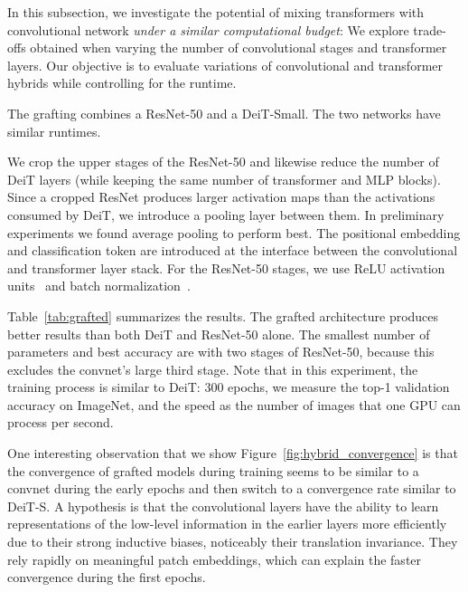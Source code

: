 \documentclass[10pt,twocolumn,letterpaper]{article}
\makeatletter
\renewcommand{\paragraph}{\@startsection{paragraph}{4}{\z@}{1.0ex \@plus 1ex \@minus .2ex}{-1em}{\normalfont\normalsize\bfseries}}
\makeatother
\begin{document}
In this subsection, we investigate the potential of mixing transformers with convolutional network \emph{under a similar computational budget}: 
We explore trade-offs obtained when varying the number of convolutional stages
and transformer layers. Our objective is to evaluate  variations of convolutional and transformer hybrids while controlling for the runtime. 






\paragraph{Grafting.}

The grafting combines a ResNet-50 and a DeiT-Small.
The two networks have similar runtimes.

We crop the upper stages of the ResNet-50 and likewise reduce the number of DeiT layers (while keeping the same number of transformer and MLP blocks). 
Since a cropped ResNet produces larger activation maps than the  activations consumed by DeiT, we introduce a pooling layer between them. 
In preliminary experiments we found average pooling to perform best.
The positional embedding and classification token are introduced at the interface between the convolutional and transformer layer stack. For the ResNet-50 stages, we use
ReLU activation units~\cite{nair2010rectified} and batch normalization~\cite{ioffe15batchnorm}.

\paragraph{Results.}
Table~\ref{tab:grafted} summarizes the results. 
The grafted architecture produces better results than both DeiT and ResNet-50 alone.
The smallest number of parameters and best accuracy are with two stages of ResNet-50, because this excludes the convnet's large third stage. 
Note that in this experiment, the training process is similar to DeiT: 300 epochs, we measure the top-1 validation accuracy on ImageNet, and the speed as the number of images that one GPU can process per second. 

One interesting observation that we show Figure~\ref{fig:hybrid_convergence} is that the convergence of grafted models during training seems to be similar to a convnet during the early epochs and then switch to a convergence rate similar to DeiT-S. 
A hypothesis is that the convolutional layers have the ability to learn representations of the low-level information in the earlier layers more efficiently due to their strong inductive biases, noticeably their translation invariance. 
They rely rapidly on meaningful patch embeddings, which can explain the faster convergence during the first epochs.
\end{document}

